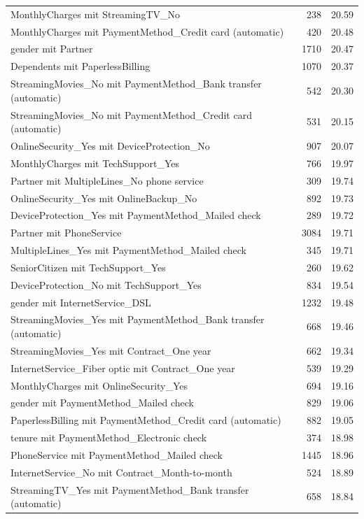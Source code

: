 \documentclass[a4paper,11pt]{article}
\begin{document}
\begin{longtable}{p{9cm}rr}
MonthlyCharges mit StreamingTV\_No & 238 & 20.59 \\
MonthlyCharges mit PaymentMethod\_Credit card (automatic) & 420 & 20.48 \\
gender mit Partner & 1710 & 20.47 \\
Dependents mit PaperlessBilling & 1070 & 20.37 \\
StreamingMovies\_No mit PaymentMethod\_Bank transfer (automatic) & 542 & 20.30 \\
StreamingMovies\_No mit PaymentMethod\_Credit card (automatic) & 531 & 20.15 \\
OnlineSecurity\_Yes mit DeviceProtection\_No & 907 & 20.07 \\
MonthlyCharges mit TechSupport\_Yes & 766 & 19.97 \\
Partner mit MultipleLines\_No phone service & 309 & 19.74 \\
OnlineSecurity\_Yes mit OnlineBackup\_No & 892 & 19.73 \\
DeviceProtection\_Yes mit PaymentMethod\_Mailed check & 289 & 19.72 \\
Partner mit PhoneService & 3084 & 19.71 \\
MultipleLines\_Yes mit PaymentMethod\_Mailed check & 345 & 19.71 \\
SeniorCitizen mit TechSupport\_Yes & 260 & 19.62 \\
DeviceProtection\_No mit TechSupport\_Yes & 834 & 19.54 \\
gender mit InternetService\_DSL & 1232 & 19.48 \\
StreamingMovies\_Yes mit PaymentMethod\_Bank transfer (automatic) & 668 & 19.46 \\
StreamingMovies\_Yes mit Contract\_One year & 662 & 19.34 \\
InternetService\_Fiber optic mit Contract\_One year & 539 & 19.29 \\
MonthlyCharges mit OnlineSecurity\_Yes & 694 & 19.16 \\
gender mit PaymentMethod\_Mailed check & 829 & 19.06 \\
PaperlessBilling mit PaymentMethod\_Credit card (automatic) & 882 & 19.05 \\
tenure mit PaymentMethod\_Electronic check & 374 & 18.98 \\
PhoneService mit PaymentMethod\_Mailed check & 1445 & 18.96 \\
InternetService\_No mit Contract\_Month-to-month & 524 & 18.89 \\
StreamingTV\_Yes mit PaymentMethod\_Bank transfer (automatic) & 658 & 18.84 \\

\end{longtable}
\end{document}

